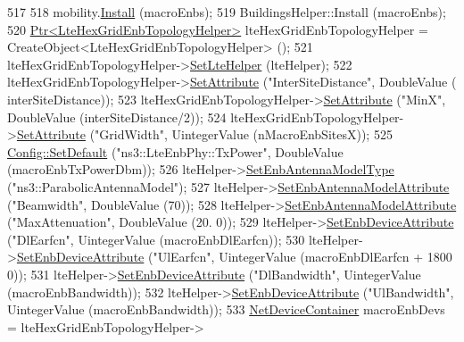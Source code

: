 \begin{DoxyCode}
517 
518   mobility.\hyperlink{classns3_1_1MobilityHelper_a07737960ee95c0777109cf2994dd97ae}{Install} (macroEnbs);
519   BuildingsHelper::Install (macroEnbs);
520   \hyperlink{classns3_1_1Ptr}{Ptr<LteHexGridEnbTopologyHelper>} lteHexGridEnbTopologyHelper = 
      CreateObject<LteHexGridEnbTopologyHelper> ();
521   lteHexGridEnbTopologyHelper->\hyperlink{classns3_1_1LteHexGridEnbTopologyHelper_addb17227a4a8500c37e24cadc81d84e5}{SetLteHelper} (lteHelper);
522   lteHexGridEnbTopologyHelper->\hyperlink{classns3_1_1ObjectBase_ac60245d3ea4123bbc9b1d391f1f6592f}{SetAttribute} (\textcolor{stringliteral}{"InterSiteDistance"}, DoubleValue (
      interSiteDistance));
523   lteHexGridEnbTopologyHelper->\hyperlink{classns3_1_1ObjectBase_ac60245d3ea4123bbc9b1d391f1f6592f}{SetAttribute} (\textcolor{stringliteral}{"MinX"}, DoubleValue (interSiteDistance/2));
524   lteHexGridEnbTopologyHelper->\hyperlink{classns3_1_1ObjectBase_ac60245d3ea4123bbc9b1d391f1f6592f}{SetAttribute} (\textcolor{stringliteral}{"GridWidth"}, UintegerValue (nMacroEnbSitesX));
525   \hyperlink{group__config_ga2e7882df849d8ba4aaad31c934c40c06}{Config::SetDefault} (\textcolor{stringliteral}{"ns3::LteEnbPhy::TxPower"}, DoubleValue (macroEnbTxPowerDbm));
526   lteHelper->\hyperlink{classns3_1_1LteHelper_a758494fc0edaeaf7f311c6aa1c0b42d9}{SetEnbAntennaModelType} (\textcolor{stringliteral}{"ns3::ParabolicAntennaModel"});
527   lteHelper->\hyperlink{classns3_1_1LteHelper_ac0c1bc4eddaf7f8711f282cb681f99c5}{SetEnbAntennaModelAttribute} (\textcolor{stringliteral}{"Beamwidth"},   DoubleValue (70));
528   lteHelper->\hyperlink{classns3_1_1LteHelper_ac0c1bc4eddaf7f8711f282cb681f99c5}{SetEnbAntennaModelAttribute} (\textcolor{stringliteral}{"MaxAttenuation"},     DoubleValue (20.
      0));
529   lteHelper->\hyperlink{classns3_1_1LteHelper_ac42f0f3d6cd8473d810bfbbeb5d592e0}{SetEnbDeviceAttribute} (\textcolor{stringliteral}{"DlEarfcn"}, UintegerValue (macroEnbDlEarfcn));
530   lteHelper->\hyperlink{classns3_1_1LteHelper_ac42f0f3d6cd8473d810bfbbeb5d592e0}{SetEnbDeviceAttribute} (\textcolor{stringliteral}{"UlEarfcn"}, UintegerValue (macroEnbDlEarfcn + 1800
      0));
531   lteHelper->\hyperlink{classns3_1_1LteHelper_ac42f0f3d6cd8473d810bfbbeb5d592e0}{SetEnbDeviceAttribute} (\textcolor{stringliteral}{"DlBandwidth"}, UintegerValue (macroEnbBandwidth));
532   lteHelper->\hyperlink{classns3_1_1LteHelper_ac42f0f3d6cd8473d810bfbbeb5d592e0}{SetEnbDeviceAttribute} (\textcolor{stringliteral}{"UlBandwidth"}, UintegerValue (macroEnbBandwidth));
533   \hyperlink{classns3_1_1NetDeviceContainer}{NetDeviceContainer} macroEnbDevs = lteHexGridEnbTopologyHelper->

\end{DoxyCode}

